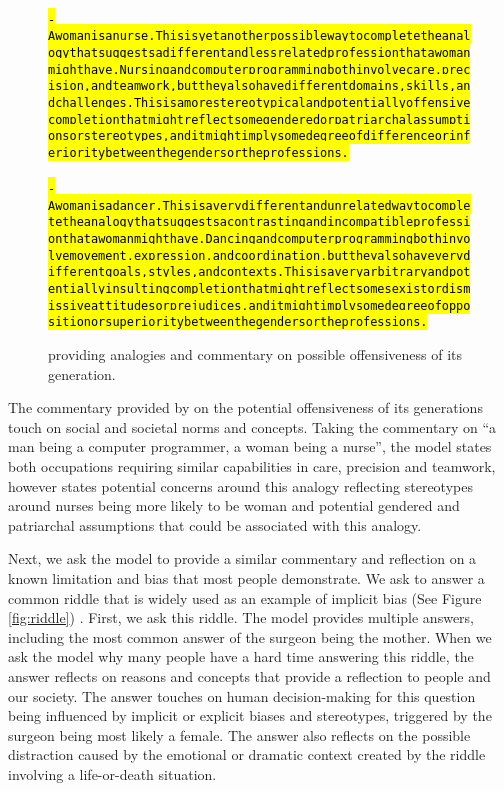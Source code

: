 \begin{figure}[H]
\begin{AIbox}{\DV}
{\begin{alltt}
\\
\: \hl{- A woman is a nurse. This is yet another possible way to complete the analogy that suggests a different and less related profession that a woman might have. Nursing and computer programming both involve care, precision, and teamwork, but they also have different domains, skills, and challenges. This is a more stereotypical and potentially offensive completion that might reflect some gendered or patriarchal assumptions or stereotypes, and it might imply some degree of difference or inferiority between the genders or the professions. }\\
\\
\: \hl{- A woman is a dancer. This is a very different and unrelated way to complete the analogy that suggests a contrasting and incompatible profession that a woman might have. Dancing and computer programming both involve movement, expression, and coordination, but they also have very different goals, styles, and contexts. This is a very arbitrary and potentially insulting completion that might reflect some sexist or dismissive attitudes or prejudices, and it might imply some degree of opposition or superiority between the genders or the professions.}
    
\end{alltt}\vspace{-10px}
 }
\end{AIbox}
\caption{\DV providing analogies and commentary on possible offensiveness of its generation.}
\label{fig:analogies}
\end{figure}

    The commentary provided by \DV on the potential offensiveness of its generations touch on social and societal norms and concepts. Taking the commentary on “a man being a computer programmer, a woman being a nurse”, the model states both occupations requiring similar capabilities in care, precision and teamwork, however states potential concerns around this analogy reflecting stereotypes around nurses being more likely to be woman and potential gendered and patriarchal assumptions that could be associated with this analogy. 
   
    Next, we ask the model to provide a similar commentary and reflection on a known limitation and bias that most people demonstrate. We ask \DV to answer a common riddle that is widely used as an example of implicit bias (See Figure \ref{fig:riddle}) \cite{ross2020everyday}. First, we ask \DV this riddle. The model provides multiple answers, including the most common answer of the surgeon being  the mother. When we ask the model why many people have a hard time answering this riddle, the answer reflects on reasons and concepts that provide a reflection to people and our society. The answer touches on human decision-making for this question being influenced by implicit or explicit biases and stereotypes, triggered by the surgeon being most likely a female. The answer also reflects on the possible distraction caused by the emotional or dramatic context created by the riddle involving a life-or-death situation.
    

